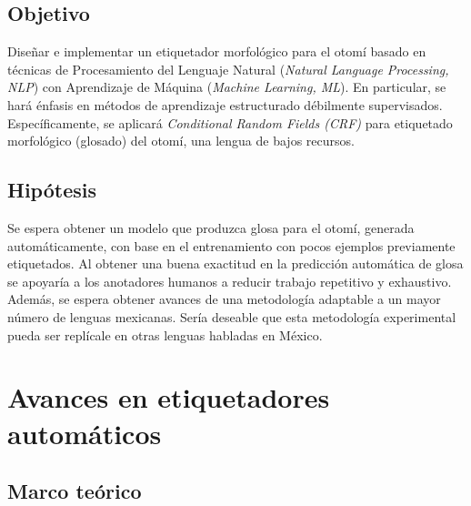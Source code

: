 \documentclass[letterpaper,12pt,oneside]{scrbook}
\theoremstyle{definition}
\begin{document}
	
	\section{Objetivo}

	
	Diseñar e implementar un etiquetador morfológico para el otomí basado en técnicas de Procesamiento del Lenguaje Natural (\textit{Natural Language Processing, NLP}) con Aprendizaje de Máquina (\textit{Machine Learning, ML}). En particular, se hará énfasis en métodos de aprendizaje estructurado débilmente supervisados. Específicamente, se aplicará \textit{Conditional Random Fields (CRF)} para etiquetado morfológico (glosado) del otomí, una lengua de bajos recursos.

	
	\section{Hipótesis}

	
	Se espera obtener un modelo que produzca glosa para el otomí, generada automáticamente, con base en el entrenamiento con pocos ejemplos previamente etiquetados. Al obtener una buena exactitud en la predicción automática de glosa se apoyaría a los anotadores humanos a reducir trabajo repetitivo y exhaustivo. Además, se espera obtener avances de una metodología adaptable a un mayor número de lenguas mexicanas. Sería deseable que esta metodología experimental pueda ser replícale en otras lenguas habladas en México.

	
	\chapter{Avances en etiquetadores automáticos}

	

	
	\section{Marco teórico}\label{sec:marco}

	

	





\end{document}
